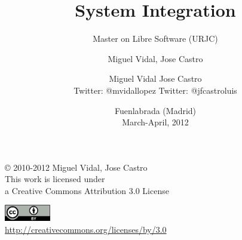 \documentclass{beamer}
\begin{document}
\title{System Integration}
\subtitle{Master on Libre Software (URJC)}
\author{Miguel Vidal, Jose Castro} 
\date{\footnotesize{Fuenlabrada (Madrid) \\ March-April, 2012}}
\author{Miguel Vidal \hspace{1cm} Jose Castro \\
\hspace{0.5mm} {\tiny Twitter: @mvidallopez \hspace{1.1cm}Twitter: @jfcastroluis}
}



\begin{frame}
  \vspace{2cm}
  \begin{flushright}
    {\small \copyright{} 2010-2012 Miguel Vidal, Jose Castro} \\
    \medskip
    {\scriptsize This work is licensed under \\ a Creative Commons Attribution 3.0 License}
  \end{flushright}
  \begin{flushright}
    \href{http://creativecommons.org/licenses/by/3.0/es}{\includegraphics[width=2cm]{format/cc-by.png}} \\
    {\tiny \url{http://creativecommons.org/licenses/by/3.0}}
  \end{flushright}
\end{frame}%

\usebackgroundtemplate{}

\end{document}
